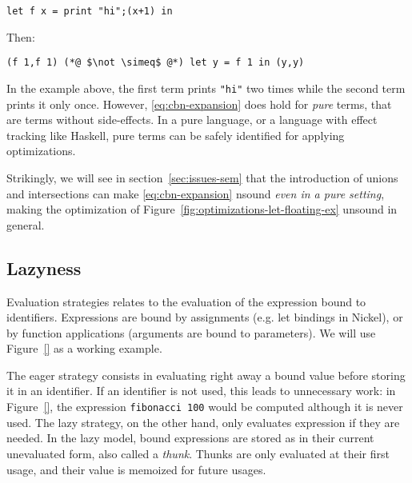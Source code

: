 \documentclass[sigplan,10pt,review,anonymous]{acmart}
\newcommand{\unsure}[2][1=]{}
\newcommand{\resolved}[2]{}
\newcommand{\nickel}[1]{\lstinline[language=nickel]{#1}}
\begin{document}
\begin{lstlisting}[language=Nickel]
let f x = print "hi";(x+1) in 
\end{lstlisting}

Then:

\begin{lstlisting}[language=Nickel]
(f 1,f 1) (*@ $\not \simeq$ @*) let y = f 1 in (y,y)
\end{lstlisting}

In the example above, the first term prints \nickel{"hi"} two times while the
second term prints it only once. However, \ref{eq:cbn-expansion} does hold for
\emph{pure} terms, that are terms without side-effects. In a pure language, or a
language with effect tracking like Haskell, pure terms can be safely identified for applying
optimizations.

Strikingly, we will see in section~\ref{sec:issues-sem} that the introduction of
unions and intersections can make \ref{eq:cbn-expansion} \resolved{it} unsound
\emph{even in a pure setting}, making the optimization of
Figure~\ref{fig:optimizations-let-floating-ex} unsound in general.

\unsure{Should we tease already here that unions and intersections break this
even for pure terms?}

\subsection*{Lazyness}
Evaluation strategies relates to the evaluation of the expression bound to
identifiers. Expressions are bound by assignments (e.g. let bindings in
Nickel), or by function applications (arguments are bound to parameters). We
will use Figure~\ref{} as a working example.

The eager strategy consists in evaluating right away a bound value before
storing it in an identifier. If an identifier is not used, this leads to
unnecessary work: in Figure~\ref{}, the expression \nickel{fibonacci 100} would
be computed although it is never used. The lazy strategy, on the other hand,
only evaluates expression if they are needed. In the lazy model, bound
expressions are stored as in their current unevaluated form, also called a
\emph{thunk}. Thunks are only evaluated at their first usage, and their value is
memoized for future usages.
\end{document}
